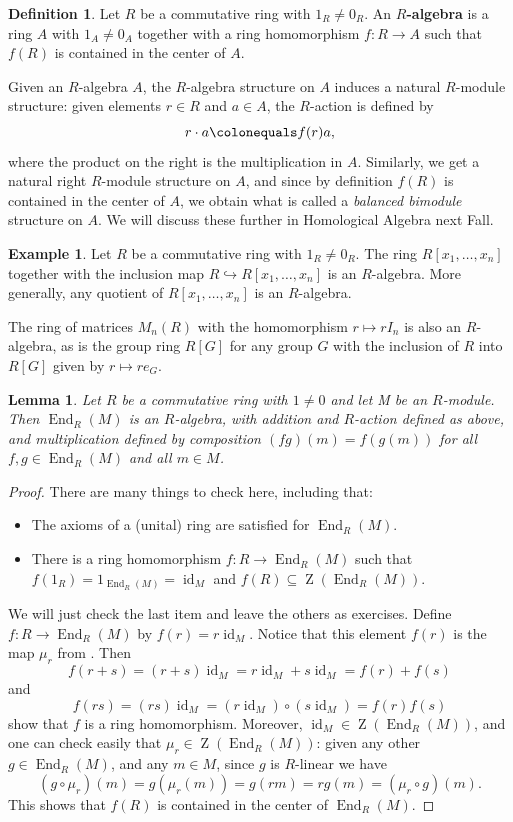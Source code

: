 \documentclass[12pt]{report}
\newtheorem{lemma}[theorem]{Lemma}
\numberwithin{equation}{section}
\numberwithin{theorem}{chapter}
\theoremstyle{definition}
\newtheorem{definition}[theorem]{Definition}
\newtheorem{example}[theorem]{Example}
\newtheorem*{basic properties}{Basic Properties}
\newtheorem*{Important Remark}{Important Remark}
\newcommand{\df}[1]{{\bf #1}\index{#1}}
\DeclareMathOperator{\id}{id}
\DeclareMathOperator{\Zc}{Z}
\DeclareMathOperator{\End}{End}
\begin{document}
\begin{definition}
	Let $R$ be a commutative ring with $1_R \neq 0_R$. An \df{$R$-algebra} is a ring $A$ with $1_A \neq 0_A$ together with a ring homomorphism $f\!: R \to A$ such that $f(R)$ is contained in the center of $A$.
\end{definition}


Given an $R$-algebra $A$, the $R$-algebra structure on $A$ induces a natural $R$-module structure: given elements $r \in R$ and $a \in A$, the $R$-action is defined by 
$$r \cdot a \colonequals f(r) a,$$
where the product on the right is the multiplication in $A$. Similarly, we get a natural right $R$-module structure on $A$, and since by definition $f(R)$ is contained in the center of $A$, we obtain what is called a \emph{balanced bimodule} structure on $A$. We will discuss these further in Homological Algebra next Fall.


\begin{example}
Let $R$ be a commutative ring with $1_R \neq 0_R$. The ring $R[x_1,\ldots, x_n]$ together with the inclusion map $R \hookrightarrow R[x_1,\ldots, x_n]$ is an $R$-algebra. More generally, any quotient of $R[x_1,\ldots, x_n]$ is an $R$-algebra.

The ring of matrices $M_n(R)$ with the homomorphism $r \mapsto r I_n$ is also an $R$-algebra, as is the group ring $R[G]$ for any group $G$ with the inclusion of $R$ into $R[G]$ given by $r \mapsto r e_G$.
\end{example}



\begin{lemma}
 Let $R$ be a commutative ring with $1 \neq 0$ and let M be an $R$-module. Then $\End_R(M)$ is an $R$-algebra, with addition and $R$-action defined as above, and multiplication defined by composition $(fg)(m) = f(g(m))$ for all $f,g \in \End_R(M)$ and all $m \in M$.
\end{lemma}

\begin{proof}
There are many things to check here, including that:
\begin{itemize}
\item The axioms of a (unital) ring are satisfied for $\End_R(M)$.
\item There is a ring homomorphism $f\!:R\to \End_R(M)$ such that $f(1_R)=1_{\End_R(M)}=\id_M$ and $f(R)\subseteq \Zc(\End_R(M))$.
\end{itemize}
We will just check the last item and leave the others as exercises. Define $f\!:R\to \End_R(M)$ by $f(r)=r\id_M$. Notice that this element $f(r)$ is the map $\mu_r$ from . Then
$$f(r+s)=(r+s)\id_M=r\id_M+s\id_M=f(r)+f(s)$$ 
and 
$$f(rs)=(rs)\id_M=(r\id_M)\circ(s\id_M)=f(r)f(s)$$
 show that $f$ is a ring homomorphism. Moreover, $\id_M\in \Zc(\End_R(M))$, and one can check easily that $\mu_r \in \Zc(\End_R(M))$: given any other $g \in \End_R(M)$, and any $m \in M$, since $g$ is $R$-linear we have
$$(g \circ \mu_r)(m) = g(\mu_r(m)) = g(rm) = rg(m) = (\mu_r \circ g) (m).$$ 
This shows that $f(R)$ is contained in the center of $\End_R(M)$.
\end{proof}
\end{document}

